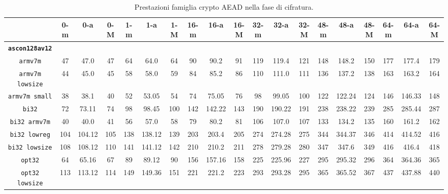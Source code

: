 \begin{landscape}
    \begin{table}[]
        \caption{Prestazioni famiglia crypto AEAD nella fase di cifratura.}
        \begin{adjustbox}{width=600pt}
            \centering
			\begin{tabular}{|c|c|c|c|c|c|c|c|c|c|c|c|c|c|c|c|c|c|c|}
				\hline
				& \textbf{0-m} & \textbf{0-a} & \textbf{0-M} & \textbf{1-m} & \textbf{1-a} & \textbf{1-M} & \textbf{16-m} & \textbf{16-a} & \textbf{16-M} & \textbf{32-m} & \textbf{32-a} & \textbf{32-M} & \textbf{48-m} & \textbf{48-a} & \textbf{48-M} & \textbf{64-m} & \textbf{64-a} & \textbf{64-M} \\
				\hline
				\texttt{\textbf{ascon128av12}} & & & & & & & & & & & & & & & & & & \\
				\hline
				\texttt{armv7m} & 47 & 47.0 & 47 & 64 & 64.0 & 64 & 90 & 90.2 & 91 & 119 & 119.4 & 121 & 148 & 148.2 & 150 & 177 & 177.4 & 179 \\
				\hline
				\texttt{armv7m lowsize} & 44 & 45.0 & 45 & 58 & 58.0 & 59 & 84 & 85.2 & 86 & 110 & 111.0 & 111 & 136 & 137.2 & 138 & 163 & 163.2 & 164 \\
				\hline
				\texttt{armv7m small} & 38 & 38.1 & 40 & 52 & 53.05 & 54 & 74 & 75.05 & 76 & 98 & 99.05 & 100 & 122 & 122.24 & 124 & 146 & 146.33 & 148 \\
				\hline
				\texttt{bi32} & 72 & 73.11 & 74 & 98 & 98.45 & 100 & 142 & 142.22 & 143 & 190 & 190.22 & 191 & 238 & 238.22 & 239 & 285 & 285.44 & 287 \\
				\hline
				\texttt{bi32 armv7m} & 40 & 40.0 & 41 & 56 & 57.0 & 58 & 79 & 80.2 & 81 & 106 & 107.0 & 107 & 133 & 134.2 & 135 & 160 & 161.2 & 162 \\
				\hline
				\texttt{bi32 lowreg} & 104 & 104.12 & 105 & 138 & 138.12 & 139 & 203 & 203.4 & 205 & 274 & 274.28 & 275 & 344 & 344.37 & 346 & 414 & 414.52 & 416 \\
				\hline
				\texttt{bi32 lowsize} & 108 & 108.12 & 110 & 141 & 141.12 & 142 & 210 & 210.2 & 211 & 278 & 279.28 & 280 & 347 & 347.6 & 349 & 416 & 416.4 & 418 \\
				\hline
				\texttt{opt32} & 64 & 65.16 & 67 & 89 & 89.12 & 90 & 156 & 157.16 & 158 & 225 & 225.96 & 227 & 295 & 295.32 & 296 & 364 & 364.36 & 365 \\
				\hline
				\texttt{opt32 lowsize} & 113 & 113.12 & 114 & 149 & 149.36 & 151 & 221 & 221.2 & 223 & 293 & 293.28 & 295 & 365 & 365.52 & 367 & 437 & 437.88 & 440 \\

\end{tabular}
\end{adjustbox}
\end{table}
\end{landscape}
